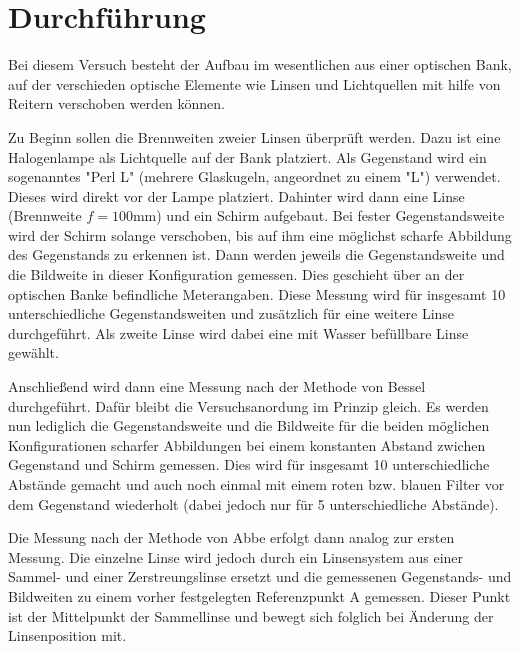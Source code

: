 \section{Durchführung}
\label{sec:Durchführung}
Bei diesem Versuch besteht der Aufbau im wesentlichen aus einer optischen Bank, auf
der verschieden optische Elemente wie Linsen und Lichtquellen mit hilfe von Reitern
verschoben werden können.

Zu Beginn sollen die Brennweiten zweier Linsen überprüft werden. Dazu ist eine Halogenlampe als Lichtquelle auf
der Bank platziert. Als Gegenstand wird ein sogenanntes "Perl L" (mehrere Glaskugeln, angeordnet zu einem "L")
verwendet. Dieses wird direkt vor der Lampe platziert. Dahinter wird dann eine Linse (Brennweite $f = 100$mm) und ein Schirm aufgebaut.
Bei fester Gegenstandsweite wird der Schirm solange verschoben, bis auf ihm eine möglichst scharfe Abbildung des
Gegenstands zu erkennen ist. Dann werden jeweils die Gegenstandsweite und die Bildweite in dieser Konfiguration
gemessen. Dies geschieht über an der optischen Banke befindliche Meterangaben. Diese Messung wird für insgesamt 10 unterschiedliche
Gegenstandsweiten und zusätzlich für eine weitere Linse durchgeführt. Als zweite Linse wird dabei eine mit Wasser befüllbare Linse
gewählt.

Anschließend wird dann eine Messung nach der Methode von Bessel durchgeführt. Dafür bleibt die Versuchsanordung im
Prinzip gleich. Es werden nun lediglich die Gegenstandsweite und die Bildweite für die beiden möglichen Konfigurationen
scharfer Abbildungen bei einem konstanten Abstand zwichen Gegenstand und Schirm gemessen. Dies wird für insgesamt 10 unterschiedliche
Abstände gemacht und auch noch einmal mit einem roten bzw. blauen Filter vor dem Gegenstand wiederholt (dabei jedoch nur für 5 unterschiedliche
Abstände).

Die Messung nach der Methode von Abbe erfolgt dann analog zur ersten Messung. Die einzelne Linse wird jedoch durch ein Linsensystem aus einer
Sammel- und einer Zerstreungslinse ersetzt und die gemessenen Gegenstands- und Bildweiten zu einem vorher festgelegten Referenzpunkt A gemessen.
Dieser Punkt ist der Mittelpunkt der Sammellinse und bewegt sich folglich bei Änderung der Linsenposition mit.
